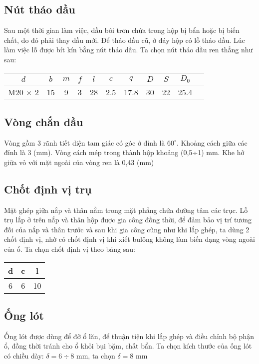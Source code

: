 \subsection{Nút tháo dầu}
Sau một thời gian làm việc, dầu bôi trơn chứa trong hộp bị bẩn hoặc bị biến chất,
do đó phải thay dầu mới. Để tháo dầu cũ, ở đáy hộp có lỗ tháo dầu. Lúc làm việc lỗ
được bít kín bằng nút tháo dầu. Ta chọn nút tháo dầu ren thẳng như sau:
\begin{table}[H]
    \centering
    \begin{tabular}{|c|c|c|c|c|c|c|c|c|c|c|}
    \hline
    $d$ & $b$ & $m$ & $f$ & $l$ & $c$ & $q$ & $D$ & $S$ & $D_0$ \\
    \hline
    M20 × 2 & 15 & 9 & 3 & 28 & 2.5 & 17.8 & 30 & 22 & 25.4 \\
    \hline
    \end{tabular}
    \end{table}

\subsection{Vòng chắn dầu}
Vòng gồm 3 rãnh tiết diện tam giác có góc ở đỉnh là $60^\circ$. Khoảng cách giữa các
đỉnh là 3 (mm). Vòng cách mép trong thành hộp khoảng (0,5÷1) mm. Khe hở giữa vỏ
với mặt ngoài của vòng ren là 0,43 (mm)

\subsection{Chốt định vị trụ}
Mặt ghép giữa nắp và thân nằm trong mặt phẳng chứa đường tâm các trục.
Lỗ trụ lắp ở trên nắp và thân hộp được gia công đồng thời, để đảm bảo vị trí
tương đối của nắp và thân trước và sau khi gia công cũng như khi lắp ghép,
ta dùng 2 chốt định vị, nhờ có chốt định vị khi xiết bulông không làm biến
dạng vòng ngoài của ổ. Ta chọn chốt định vị theo bảng sau: \\
\begin{center}
\begin{tabular}{|c|c|c|}
    \hline
    d & c & l \\
    \hline
    6 & 6 & 10 \\
    \hline
\end{tabular}
\end{center}

\subsection{Ống lót}
Ống lót được dùng để đỡ ổ lăn, để thuận tiện khi lắp ghép và điều chỉnh bộ phận ổ, đồng thời tránh cho ổ khỏi bụi bặm, chất bẩn. Ta chọn kích thước của ống lót có chiều dày:
$\delta = 6 \div 8 \text{ mm, ta chọn } \delta = 8 \text{ mm}$

